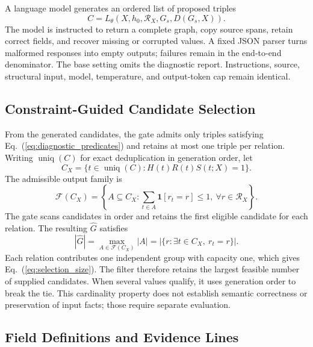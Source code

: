 A language model generates an ordered list of proposed triples
\begin{equation}
    \label{eq:proposal_generation}
    C=L_\theta(X,h_0,\mathcal R_X,G_s,D(G_s,X)).
\end{equation}
The model is instructed to return a complete graph, copy source spans, retain
correct fields, and recover missing or corrupted values. A fixed JSON parser
turns malformed responses into empty outputs; failures remain in the
end-to-end denominator. The base setting omits the diagnostic report. Instructions, source, structural input,
model, temperature, and output-token cap remain identical.

\subsection{Constraint-Guided Candidate Selection}
\label{sec:framework:constraints}

From the generated candidates, the gate admits only triples satisfying
Eq.~(\ref{eq:diagnostic_predicates}) and retains at most one triple per relation.
Writing $\operatorname{uniq}(C)$ for exact deduplication in generation order,
let
\begin{equation}
    \label{eq:eligible_candidates}
    C_X=\{t\in\operatorname{uniq}(C):H(t)R(t)S(t;X)=1\}.
\end{equation}
The admissible output family is
\begin{equation}
    \label{eq:admissible_subsets}
    \mathcal F(C_X)=\left\{A\subseteq C_X:
    \sum_{t\in A}\mathbf1[r_t=r]\leq1,\ \forall r\in\mathcal R_X\right\}.
\end{equation}
The gate scans candidates in order and retains the first eligible candidate
for each relation. The resulting $\widehat G$ satisfies
\begin{equation}
    \label{eq:selection_size}
    |\widehat G|=\max_{A\in\mathcal F(C_X)}|A|
    =|\{r:\exists t\in C_X,\ r_t=r\}|.
\end{equation}
Each relation contributes one independent group with capacity one, which
gives Eq.~(\ref{eq:selection_size}). The filter therefore retains the largest
feasible number of supplied candidates. When several values qualify, it uses
generation order to break the tie. This cardinality property does not establish
semantic correctness or preservation of input facts; those require separate
evaluation.

\subsection{Field Definitions and Evidence Lines}
\label{sec:framework:field_evidence}

